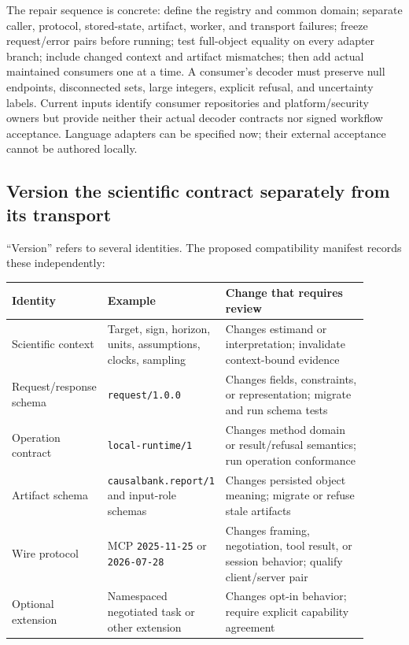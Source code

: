 The repair sequence is concrete: define the registry and common domain;
separate caller, protocol, stored-state, artifact, worker, and transport
failures; freeze request/error pairs before running; test full-object equality
on every adapter branch; include changed context and artifact mismatches;
then add actual maintained consumers one at a time. A consumer's decoder must
preserve null endpoints, disconnected sets, large integers, explicit refusal,
and uncertainty labels. Current inputs identify consumer repositories and
platform/security owners but provide neither their actual decoder contracts
nor signed workflow acceptance. Language adapters can be specified now;
their external acceptance cannot be authored locally.
\citep{exec16_parity_design,exec17_continuity_contract}

\subsection{Version the scientific contract separately from its transport}
\label{exec17:versions}

“Version” refers to several identities. The proposed compatibility manifest
records these independently:
\begin{center}
\begin{tabular}{P{0.19\linewidth}P{0.28\linewidth}P{0.43\linewidth}}
\hline
Identity & Example & Change that requires review\\
\hline
Scientific context & Target, sign, horizon, units, assumptions, clocks, sampling & Changes estimand or interpretation; invalidate context-bound evidence\\
Request/response schema & \texttt{request/1.0.0} & Changes fields, constraints, or representation; migrate and run schema tests\\
Operation contract & \texttt{local-runtime/1} & Changes method domain or result/refusal semantics; run operation conformance\\
Artifact schema & \texttt{causalbank.report/1} and input-role schemas & Changes persisted object meaning; migrate or refuse stale artifacts\\
Wire protocol & MCP \texttt{2025-11-25} or \texttt{2026-07-28} & Changes framing, negotiation, tool result, or session behavior; qualify client/server pair\\
Optional extension & Namespaced negotiated task or other extension & Changes opt-in behavior; require explicit capability agreement\\
\hline
\end{tabular}
\end{center}

